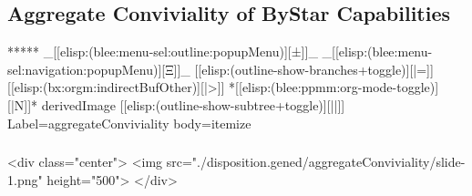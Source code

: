 \begin{whenOrg}
\section{Aggregate Conviviality of ByStar Capabilities}

\begin{whenOrg}
*****  _[[elisp:(blee:menu-sel:outline:popupMenu)][±]]_ _[[elisp:(blee:menu-sel:navigation:popupMenu)][Ξ]]_ [[elisp:(outline-show-branches+toggle)][|=]] [[elisp:(bx:orgm:indirectBufOther)][|>]] *[[elisp:(blee:ppmm:org-mode-toggle)][|N]]*  derivedImage [[elisp:(outline-show-subtree+toggle)][||]] Label=aggregateConviviality  body=itemize
\end{whenOrg}

\begin{htmlonly}

\begin{frame}[fragile,plain,label=aggregateConviviality]
    \frametitle{}
    \framesubtitle{}
    \begin{rawhtml}
<div class="center">
<img src="./disposition.gened/aggregateConviviality/slide-1.png" height="500">
</div>
    \end{rawhtml}
\end{frame}
\end{htmlonly}

\begin{verblatex}

\begin{frame}[fragile,plain,label=aggregateConviviality]
    \frametitle{}
    \framesubtitle{}

\end{frame}
\end{verblatex}
\end{whenOrg}
